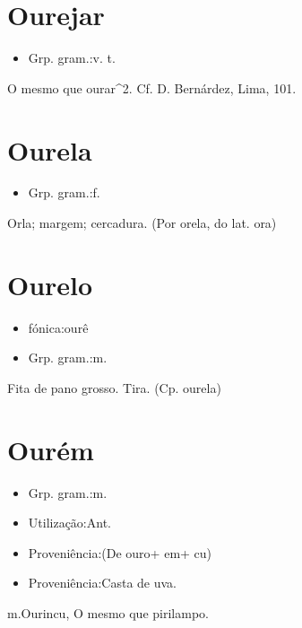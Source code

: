 \section{Ourejar}
\begin{itemize}
\item {Grp. gram.:v. t.}
\end{itemize}
O mesmo que \textunderscore ourar\textunderscore ^2. Cf. D. Bernárdez, \textunderscore Lima\textunderscore , 101.
\section{Ourela}
\begin{itemize}
\item {Grp. gram.:f.}
\end{itemize}
Orla; margem; cercadura.
(Por \textunderscore orela\textunderscore , do lat. \textunderscore ora\textunderscore )
\section{Ourelo}
\begin{itemize}
\item {fónica:ourê}
\end{itemize}
\begin{itemize}
\item {Grp. gram.:m.}
\end{itemize}
Fita de pano grosso.
Tira.
(Cp. \textunderscore ourela\textunderscore )
\section{Ourém}
\begin{itemize}
\item {Grp. gram.:m.}
\end{itemize}
\begin{itemize}
\item {Utilização:Ant.}
\end{itemize}
\begin{itemize}
\item {Proveniência:(De \textunderscore ouro\textunderscore  + \textunderscore em\textunderscore  + \textunderscore cu\textunderscore )}
\end{itemize}
\begin{itemize}
\item {Proveniência:Casta de uva.
}
\end{itemize}
\textunderscore m.\textunderscore * Ourincu,
O mesmo que \textunderscore pirilampo\textunderscore .

